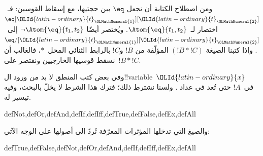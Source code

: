 \documentclass[../../../include/open-logic-section]{subfiles}
\begin{document}
ومن اصطلاح الكتابة أن نجعل $\eq$ بين حجتيها، مع إسقاط القوسين:
فـ~$\eq[{\OLId{latin-ordinary}{t}}_{\OLMathNumeral{1}}][{\OLId{latin-ordinary}{t}}_{\OLMathNumeral{2}}]$ اختصار لـ~$\Atom{\eq}{t_1,t_2}$. ويُختصر أيضًا
$\lnot \Atom{\eq}{t_1,t_2}$ إلى~$\eq/[{\OLId{latin-ordinary}{t}}_{\OLMathNumeral{1}}][{\OLId{latin-ordinary}{t}}_{\OLMathNumeral{2}}]$. وإذا كتبنا الصيغة
$(!B \ast !C)$ المؤلّفة من $!B$ و$!C$ بالرابط الثنائي
المحل~$\ast$، فالغالب أن نسقط قوسيها الخارجيين ونقتصر
على~$!B \ast !C$.

\begin{intro}
وفي بعض كتب المنطق لا بد من ورود ال!!{variable}~${\OLId{latin-ordinary}{x}}$ في~$!A$ حتى تُعد
%
%
%
في عداد
.
ولسنا نشترط ذلك؛ فترك هذا الشرط لا يخلّ بالبحث، وفيه تيسير له.
\end{intro}

\begin{tagblock}{defNot,defOr,defAnd,defIf,defIff,defTrue,defFalse,defEx,defAll}
\begin{defn}
والصيغ التي تدخلها المؤثرات المعرّفة تُردّ إلى أصولها على الوجه الآتي:

\begin{tagenumerate}{defTrue,defFalse,defNot,defOr,defAnd,defIf,defIff,defEx,defAll}









\end{tagenumerate}
\end{defn}
\end{tagblock}
\end{document}
